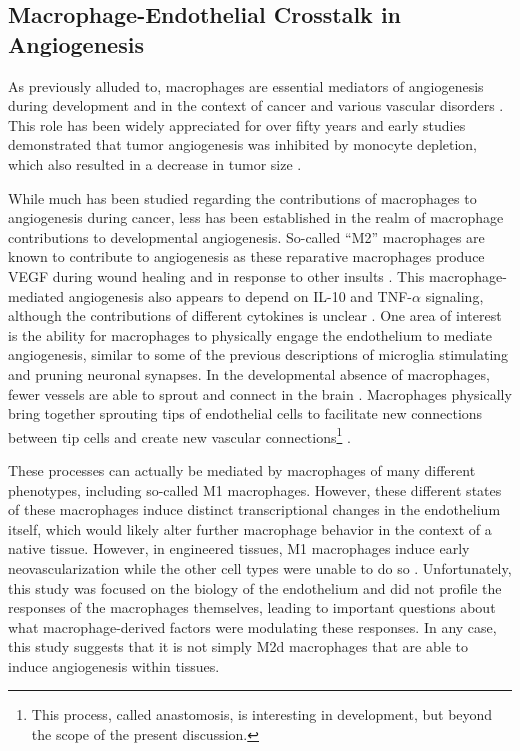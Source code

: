 \subsection{Macrophage\hyp{}Endothelial Crosstalk in Angiogenesis}\label{macang}

As previously alluded to, macrophages are essential mediators of angiogenesis during development and in the context of cancer and various vascular disorders \citep{Sunderkotter1994, Ribatti2007, Chung2011, Weis2011}. This role has been widely appreciated for over fifty years and early studies demonstrated that tumor angiogenesis was inhibited by monocyte depletion, which also resulted in a decrease in tumor size \citep{Sunderkotter1994, Polverini1977}. 

While much has been studied regarding the contributions of macrophages to angiogenesis during cancer, less has been established in the realm of macrophage contributions to developmental angiogenesis. So\hyp{}called ``M2'' macrophages are known to contribute to angiogenesis as these reparative macrophages produce VEGF during wound healing and in response to other insults \citep{Jetten2014}. This macrophage\hyp{}mediated angiogenesis also appears to depend on IL\hyp{}10 and TNF\hyp{}$\alpha$ signaling, although the contributions of different cytokines is unclear \citep{Nakamura2015, Leibovich1987}. One area of interest is the ability for macrophages to physically engage the endothelium to mediate angiogenesis, similar to some of the previous descriptions of microglia stimulating and pruning neuronal synapses. In the developmental absence of macrophages, fewer vessels are able to sprout and connect in the brain \citep{Fantin2010}. Macrophages physically bring together sprouting tips of endothelial cells to facilitate new connections between tip cells and create new vascular connections\footnote{This process, called anastomosis, is interesting in development, but beyond the scope of the present discussion.} \citep{Liu2016}. 

These processes can actually be mediated by macrophages of many different phenotypes, including so\hyp{}called M1 macrophages. However, these different states of these macrophages induce distinct transcriptional changes in the endothelium itself, which would likely alter further macrophage behavior in the context of a native tissue. However, in engineered tissues, M1 macrophages induce early neovascularization while the other cell types were unable to do so \citep{Graney2020}. Unfortunately, this study was focused on the biology of the endothelium and did not profile the responses of the macrophages themselves, leading to important questions about what macrophage\hyp{}derived factors were modulating these responses. In any case, this study suggests that it is not simply M2d macrophages that are able to induce angiogenesis within tissues.

